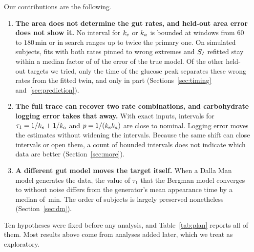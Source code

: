 Our contributions are the following.
\begin{enumerate}
\item \textbf{The area does not determine the gut rates, and held-out area error does not show it.} No interval for $k_e$ or $k_a$ is bounded at windows from $60$ to $180$\,min or in search ranges up to twice the primary one. On simulated subjects, fits with both rates pinned to wrong extremes and $S_I$ refitted stay within a median factor of \resNegZeroFastRefitIauc{} of the error of the true model. Of the other held-out targets we tried, only the time of the glucose peak separates these wrong rates from the fitted twin, and only in part (Sections~\ref{sec:timing} and~\ref{sec:prediction}).
\item \textbf{The full trace can recover two rate combinations, and carbohydrate logging error takes that away.} With exact inputs, intervals for $\tau_1=1/k_e+1/k_a$ and $p=1/(k_ek_a)$ are close to nominal. Logging error moves the estimates without widening the intervals. Because the same shift can close intervals or open them, a count of bounded intervals does not indicate which data are better (Section~\ref{sec:more}).
\item \textbf{A different gut model moves the target itself.} When a Dalla Man model generates the data, the value of $\tau_1$ that the Bergman model converges to without noise differs from the generator's mean appearance time by a median of \resPtBias{}\,min. The order of subjects is largely preserved nonetheless (Section~\ref{sec:dm}).
\end{enumerate}
Ten hypotheses were fixed before any analysis, and Table~\ref{tab:plan} reports all of them.
Most results above come from analyses added later, which we treat as exploratory.
